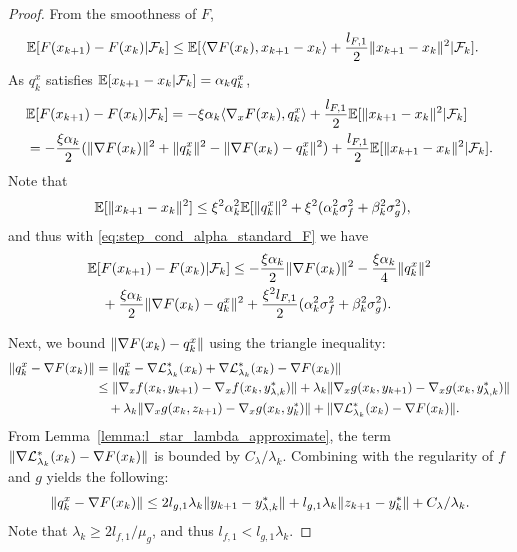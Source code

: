 \begin{proof}
From the smoothness of $F$, 
\begin{align*}
    \mathbb{E}[ F(x_{k+1}) - F(x_k) |\mathcal{F}_k] &\le \mathbb{E}[\langle \nabla F(x_k), x_{k+1} - x_k \rangle + \frac{l_{F,1}}{2} \|x_{k+1} - x_k\|^2|\mathcal{F}_k].
\end{align*}
As $q_k^x$ satisfies $\mathbb{E}[x_{k+1} - x_k|\mathcal{F}_k] = \alpha_k q_k^x$, 
\begin{align*}
    &\mathbb{E}[ F(x_{k+1}) - F(x_k) |\mathcal{F}_k] = -\xi \alpha_k \langle \nabla_x F(x_k), q_k^x \rangle + \frac{l_{F,1}}{2} \mathbb{E}[\|x_{k+1} - x_k\|^2  |\mathcal{F}_k] \\
    &= -\frac{\xi \alpha_k}{2} (\|\nabla F(x_k)\|^2 + \|q_k^x\|^2 - \| \nabla F(x_k) - q_k^x \|^2) + \frac{l_{F,1}}{2} \mathbb{E}[ \|x_{k+1} - x_k\|^2 |\mathcal{F}_k].
\end{align*}
Note that
\begin{align*}
    \mathbb{E}[\|x_{k+1} - x_k\|^2] &\le \xi^2 \alpha_k^2 \mathbb{E}[\|q_k^x\|^2 + \xi^2 (\alpha_k^2 \sigma_f^2 + \beta_k^2 \sigma_g^2),
\end{align*}
and thus with \eqref{eq:step_cond_alpha_standard_F} we have
\begin{align*}
    &\mathbb{E}[ F(x_{k+1}) - F(x_k) |\mathcal{F}_k] \le -\frac{\xi \alpha_k}{2} \|\nabla F(x_k)\|^2 - \frac{\xi \alpha_k}{4} \|q_k^x\|^2 \\
    &\quad + \frac{\xi \alpha_k}{2} \|\nabla F(x_k) - q_k^x\|^2 + \frac{\xi^2 l_{F,1}}{2} (\alpha_k^2 \sigma_f^2 + \beta_k^2 \sigma_g^2).
\end{align*}

    
Next, we bound $\|\nabla F(x_k) - q_k^x\|$ using the triangle inequality:
\begin{align*}
    \|q_k^x - \nabla F(x_k)\| &= \|q_k^x - \nabla \mathcal{L}_{\lambda_k}^*(x_k) + \nabla \mathcal{L}_{\lambda_k}^*(x_k) - \nabla F(x_k)\|  \\
    &\le \|\nabla_x f(x_k, y_{k+1}) - \nabla_x f(x_k, y_{\lambda,k}^*)\| + \lambda_k \|\nabla_x g(x_k, y_{k+1}) - \nabla_x g(x_k, y_{\lambda, k}^*)\| \\
    &\quad + \lambda_k \|\nabla_x g(x_k, z_{k+1}) - \nabla_x g(x_k, y_k^*)\| + \| \nabla \mathcal{L}_{\lambda_k}^*(x_k) - \nabla F(x_k)\|.
\end{align*}
From Lemma~\ref{lemma:l_star_lambda_approximate}, the term $\| \nabla \mathcal{L}_{\lambda_k}^*(x_k) - \nabla F(x_k)\|$ is bounded by $C_\lambda / \lambda_k$. Combining with the regularity of $f$ and $g$ yields the following:
\begin{align}
\label{eq:fxfx1}
    \|q_k^x - \nabla F(x_k)\| \le 2 l_{g,1} \lambda_k \|y_{k+1} - y_{\lambda,k}^*\| + l_{g,1} \lambda_k \|z_{k+1} - y_{k}^*\| + C_\lambda / \lambda_k.
\end{align}
Note that $\lambda_k \ge 2 l_{f,1} / \mu_g$, and thus $l_{f,1} < l_{g,1} \lambda_k$.


\end{proof}
